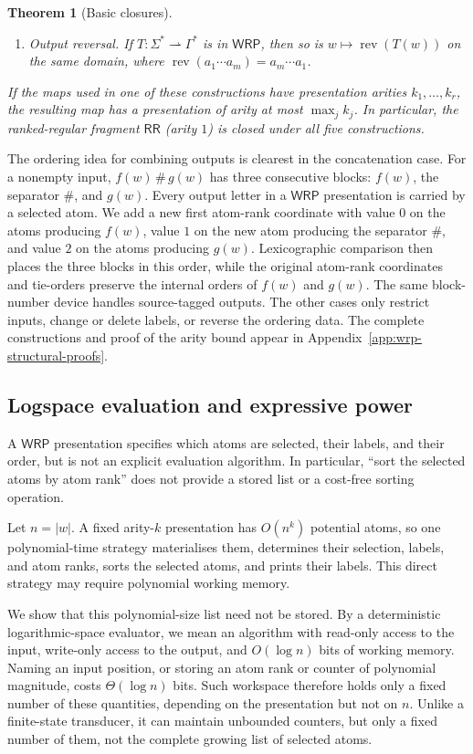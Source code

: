 \documentclass[11pt]{article}
\newtheorem{theorem}{Theorem}[section]
\theoremstyle{definition}
\newcommand{\WRP}{\mathsf{WRP}}
\newcommand{\RR}{\mathsf{RR}}
\begin{document}
\begin{theorem}[Basic closures]
\begin{enumerate}[label=(\roman*)]
\item \emph{Output reversal.}
If $T\colon\Sigma^*\rightharpoonup\Gamma^*$ is in $\WRP$, then so is
$w\mapsto\operatorname{rev}(T(w))$ on the same domain, where
$\operatorname{rev}(a_1\cdots a_m)=a_m\cdots a_1$.
\end{enumerate}
If the maps used in one of these constructions have presentation arities
$k_1,\ldots,k_r$, the resulting map has a presentation of arity at most
$\max_j k_j$.  In particular, the ranked-regular fragment $\RR$ (arity $1$)
is closed under all five constructions.
\end{theorem}

The ordering idea for combining outputs is clearest in the concatenation case.
For a nonempty input,
$f(w)\,\#\,g(w)$ has three consecutive blocks: $f(w)$, the
separator $\#$, and $g(w)$.  Every output letter in a $\WRP$ presentation is
carried by a selected atom.  We add a new first atom-rank coordinate with value $0$ on
the atoms producing $f(w)$, value $1$ on the new atom producing the separator
$\#$, and value $2$ on the atoms producing $g(w)$.  Lexicographic comparison
then places the three blocks in this order, while the original atom-rank
coordinates and tie-orders preserve the internal orders of $f(w)$ and $g(w)$.
The same block-number device handles source-tagged outputs.  The other cases
only restrict inputs, change or delete labels, or reverse the ordering data.
The complete constructions and proof of the arity bound appear in
Appendix~\ref{app:wrp-structural-proofs}.

\subsection{Logspace evaluation and expressive power}
\label{sec:wrp-evaluation}

A $\WRP$ presentation specifies which atoms are selected, their labels, and
their order, but is not an explicit evaluation algorithm.  In particular,
``sort the selected atoms by atom rank'' does not provide a stored list or a
cost-free sorting operation.

Let $n=|w|$.  A fixed arity-$k$ presentation has $O(n^k)$ potential atoms, so
one polynomial-time strategy materialises them, determines their selection,
labels, and atom ranks, sorts the selected atoms, and prints their labels.
This direct strategy may require polynomial working memory.

We show that this polynomial-size list need not be stored.  By a deterministic logarithmic-space
evaluator, we mean an algorithm with read-only access to the input, write-only
access to the output, and $O(\log n)$ bits of working memory.  Naming an input
position, or storing an atom rank or counter of polynomial magnitude, costs
$\Theta(\log n)$ bits.  Such workspace therefore holds only a fixed number of
these quantities, depending on the presentation but not on $n$.  Unlike a
finite-state transducer, it can maintain unbounded counters, but only a fixed
number of them, not the complete growing list of selected atoms.
\end{document}
